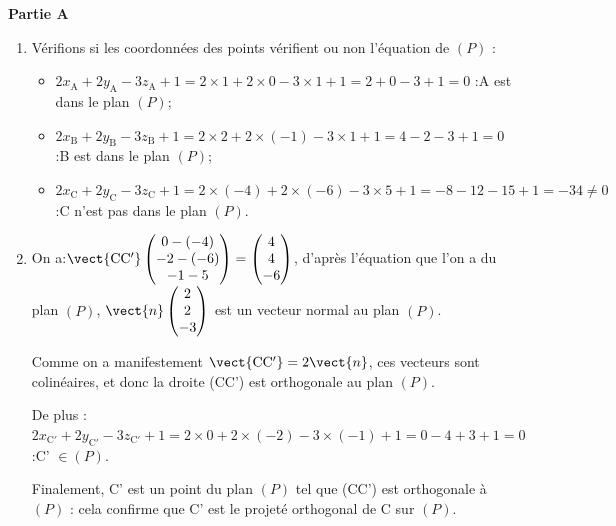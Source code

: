 \medskip
\textbf{Partie A}
\medskip

\begin{enumerate}
\item Vérifions si les coordonnées des points vérifient ou non l'équation de $(P)$ :
	\begin{itemize}
		\item $2x_\mathrm{A} + 2y_\mathrm{A} -3z_\mathrm{A} +1= 2\times 1 + 2 \times 0 - 3 \times 1 +1= 2 + 0 - 3 +1= 0 $ :\quad A est dans le plan $(P)$;
		\item $2x_\mathrm{B} + 2y_\mathrm{B} -3z_\mathrm{B} +1= 2\times 2 + 2 \times (-1) - 3 \times 1+1 = 4 -2 - 3 +1= 0$ :\quad B est dans le plan $(P)$;
		\item $2x_\mathrm{C} + 2y_\mathrm{C} -3z_\mathrm{C} +1= 2\times (-4) + 2 \times (-6) - 3 \times 5+1 = -8 -12 - 15 +1= -34 \neq 0$ :\quad C n'est pas dans le plan $(P)$.
	\end{itemize}

\item On a:\quad $ \vect{\mathrm{CC'}}\begin{pmatrix} 0-(-4)\\-2-(-6)\\-1-5 \end{pmatrix} = \begin{pmatrix}4\\4\\-6\end{pmatrix} $, d'après l'équation que l'on a du plan $ (P) $, $ \vect{n}\begin{pmatrix} 2\\2\\-3 \end{pmatrix} $ est un vecteur normal au plan $ (P) $.

Comme on a manifestement $ \vect{\mathrm{CC'}} = 2\vect{n} $, ces vecteurs sont colinéaires, et donc la droite (CC') est orthogonale au plan $ (P) $.

De plus :
\quad
	$2x_\mathrm{C'} + 2y_\mathrm{C'} -3z_\mathrm{C'} + 1 = 2\times 0 + 2 \times (-2) - 3 \times (-1) + 1 = 0 - 4 + 3 + 1 = 0$ :\quad C' $\in(P)$.

Finalement, C' est un point du plan $ (P) $ tel que (CC') est orthogonale à $(P)$ : cela confirme que C' est le projeté orthogonal de C sur $(P)$.


\end{enumerate}
